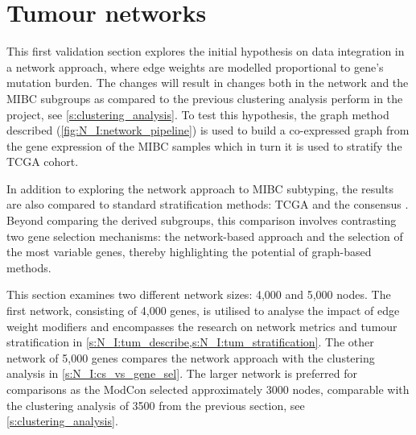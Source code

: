 \section{Tumour networks} \label{s:N_I:tum}


This first validation section explores the initial hypothesis on data integration in a network approach, where edge weights are modelled proportional to gene's mutation burden. The changes will result in changes both in the network and the MIBC subgroups as compared to the previous clustering analysis perform in the project, see \cref{s:clustering_analysis}. To test this hypothesis, the graph method described (\cref{fig:N_I:network_pipeline}) is used to build a co-expressed graph from the gene expression of the MIBC samples which in turn it is used to stratify the TCGA cohort.

In addition to exploring the network approach to MIBC subtyping, the results are also compared to standard stratification methods: TCGA \citep{Robertson2017-mg} and the consensus \citep{Kamoun2020-tj}. Beyond comparing the derived subgroups, this comparison involves contrasting two gene selection mechanisms: the network-based approach and the selection of the most variable genes, thereby highlighting the potential of graph-based methods.


This section examines two different network sizes: 4,000 and 5,000 nodes. The first network, consisting of 4,000 genes, is utilised to analyse the impact of edge weight modifiers and encompasses the research on network metrics and tumour stratification in \cref{s:N_I:tum_describe,s:N_I:tum_stratification}. The other network of 5,000 genes compares the network approach with the clustering analysis in \cref{s:N_I:cs_vs_gene_sel}. The larger network is preferred for comparisons as the ModCon selected approximately 3000 nodes, comparable with the clustering analysis of 3500 from the previous section, see \cref{s:clustering_analysis}.


